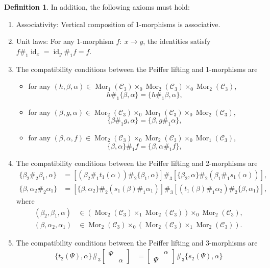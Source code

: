 \documentclass[11pt, reqno]{amsart} %
\newcommand{\mor}{{\mathop{\mathrm{Mor}}}}
\newcommand{\id}{{\mathop{\mathrm{id}}}}
\newcommand{\cC}{{\mathcal{C}}}
\theoremstyle{definition}
\newtheorem{definition}[theorem]{Definition}
\theoremstyle{remark}
\numberwithin{equation}{section}
\begin{document}
\begin{definition}
In addition, the following axioms must hold:
\begin{enumerate}
  \setcounter{enumi}{\thetemp}
  \item Associativity: Vertical composition of 1-morphisms is associative. 
  \item Unit laws: For any 1-morphism $f:~x\to y$, the identities satisfy $f\#_1\id_x = \id_y\#_1f = f$. 
  \item \label{ax:Gray3-1morPeiffer} 
  The compatibility conditions between the Peiffer lifting and 1-morphisms are
  \begin{itemize}
    \item for any $(h,\beta,\alpha) \in \mor_1(\cC_3)\times_0\mor_2(\cC_3)\times_0\mor_2(\cC_3)$,
    \[
      h\#_1\{\beta,\alpha\} = \{h\#_1\beta,\alpha\},
    \]
    \item for any $(\beta,g,\alpha) \in \mor_2(\cC_3)\times_0\mor_1(\cC_3)\times_0\mor_2(\cC_3)$,
    \[
      \{\beta\#_1g,\alpha\} = \{\beta,g\#_1\alpha\},
    \]
    \item for any $(\beta,\alpha,f) \in \mor_2(\cC_3)\times_0\mor_2(\cC_3)\times_0\mor_1(\cC_3)$,
    \[
      \{\beta,\alpha\}\#_1f = \{\beta,\alpha\#_1f\},
    \]
  \end{itemize}
  \item 
  The compatibility conditions between the Peiffer lifting and 2-morphisms are
  \begin{align}
    \label{eq:P-decom1}
    \{\beta_2\#_2\beta_1,\alpha\} &= [(\beta_2\#_1t_1(\alpha))\#_2\{\beta_1,\alpha\}]\#_3[\{\beta_2,\alpha\}\#_2(\beta_1\#_1s_1(\alpha))], \\
    \label{eq:P-decom2}
    \{\beta,\alpha_2\#_2\alpha_1\}
    &= [\{\beta,\alpha_2\}\#_2(s_1(\beta)\#_1\alpha_1)]\#_3[(t_1(\beta)\#_1\alpha_2)\#_2\{\beta,\alpha_1\}],
  \end{align}
  where
  \begin{align}
    \nonumber
    (\beta_2,\beta_1,\alpha) &\in (\mor_2(\cC_3)\times_1\mor_2(\cC_3))\times_0\mor_2(\cC_3), \\
    \nonumber
    (\beta,\alpha_2,\alpha_1) &\in \mor_2(\cC_3)\times_0(\mor_2(\cC_3)\times_1\mor_2(\cC_3)).
  \end{align}
  \item 
  The compatibility conditions between the Peiffer lifting and 3-morphisms are
  \begin{align}
    \label{eq:2-funct1}
    \{t_2(\Psi),\alpha\}\#_3\begin{bmatrix}\Psi & \\ & \alpha\end{bmatrix} &= \begin{bmatrix}&\alpha \\ \Psi &\end{bmatrix}\#_3\{s_2(\Psi),\alpha\} \\

\end{align}
\end{enumerate}
\end{definition}
\end{document}
